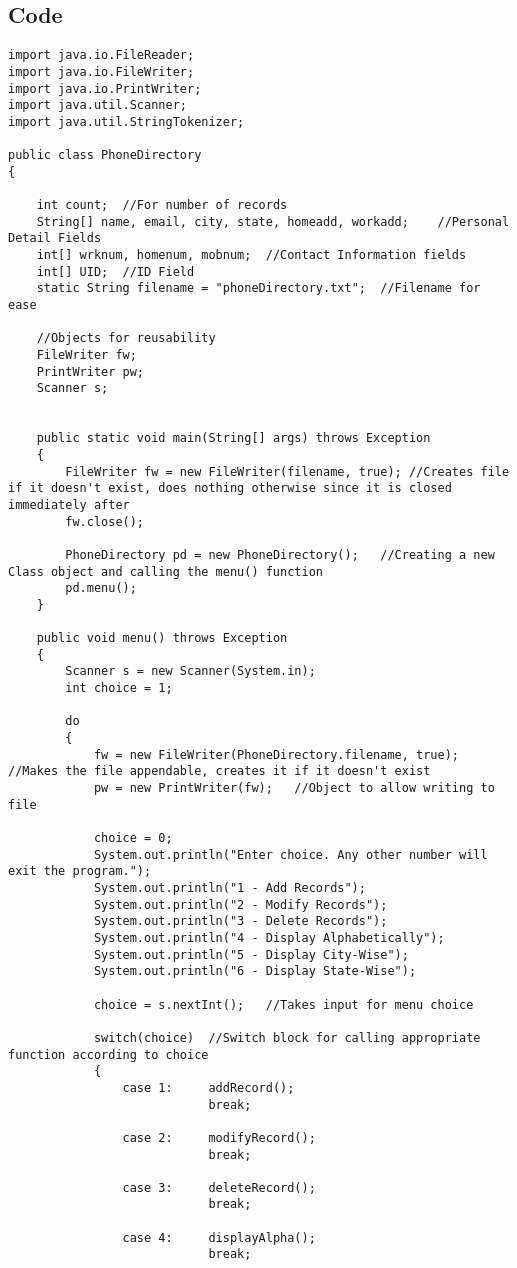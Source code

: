 \documentclass[ProgramminAssignment.tex]{subfiles}
\begin{document}
\subsection{Code}
\begin{lstlisting}
import java.io.FileReader;
import java.io.FileWriter;
import java.io.PrintWriter;
import java.util.Scanner;
import java.util.StringTokenizer;

public class PhoneDirectory
{
	
	int count;	//For number of records
	String[] name, email, city, state, homeadd, workadd;	//Personal Detail Fields	
	int[] wrknum, homenum, mobnum;	//Contact Information fields
	int[] UID;	//ID Field
	static String filename = "phoneDirectory.txt";	//Filename for ease
	
	//Objects for reusability
	FileWriter fw;
	PrintWriter pw;
	Scanner s;
	

	public static void main(String[] args) throws Exception
	{
		FileWriter fw = new FileWriter(filename, true);	//Creates file if it doesn't exist, does nothing otherwise since it is closed immediately after
		fw.close();
		
		PhoneDirectory pd = new PhoneDirectory();	//Creating a new Class object and calling the menu() function
		pd.menu();
	}
	
	public void menu() throws Exception
	{
		Scanner s = new Scanner(System.in);
		int choice = 1;
		
		do
		{
			fw = new FileWriter(PhoneDirectory.filename, true);	//Makes the file appendable, creates it if it doesn't exist
			pw = new PrintWriter(fw);	//Object to allow writing to file
			
			choice = 0;
			System.out.println("Enter choice. Any other number will exit the program.");
			System.out.println("1 - Add Records");
			System.out.println("2 - Modify Records");
			System.out.println("3 - Delete Records");
			System.out.println("4 - Display Alphabetically");
			System.out.println("5 - Display City-Wise");
			System.out.println("6 - Display State-Wise");
			
			choice = s.nextInt();	//Takes input for menu choice
			
			switch(choice)	//Switch block for calling appropriate function according to choice
			{
				case 1:		addRecord();
							break;
						
				case 2:		modifyRecord();
							break;
					
				case 3:		deleteRecord();
							break;
					
				case 4:		displayAlpha();
							break;
					

\end{lstlisting}
\end{document}

